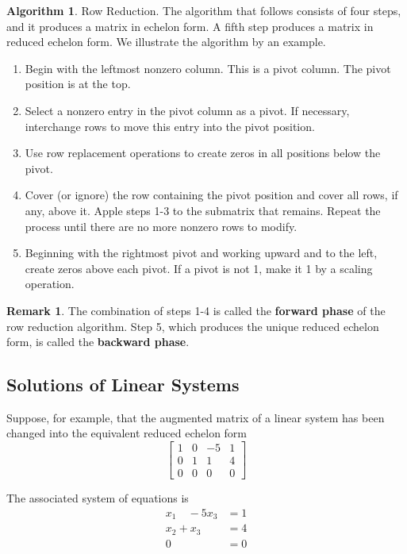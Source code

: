 \documentclass[12pt]{article}
\theoremstyle{definition}
\newtheorem{algorithm}{Algorithm}
\newtheorem*{remark}{Remark}        %
\numberwithin{equation}{theorem}    %
\begin{document}
\begin{algorithm} Row Reduction.
    The algorithm that follows consists of four steps, and it produces a matrix in echelon form. A fifth step produces a matrix in reduced echelon form. We illustrate the algorithm by an example.
    \begin{enumerate}
        \item Begin with the leftmost nonzero column. This is a pivot column. The pivot position is at the top.
        \item Select a nonzero entry in the pivot column as a pivot. If necessary, interchange rows to move this entry into the pivot position.
        \item Use row replacement operations to create zeros in all positions below the pivot.
        \item Cover (or ignore) the row containing the pivot position and cover all rows, if any, above it. Apple steps 1-3 to the submatrix that remains. Repeat the process until there are no more nonzero rows to modify.
        \item Beginning with the rightmost pivot and working upward and to the left, create zeros above each pivot. If a pivot is not 1, make it 1 by a scaling operation.
    \end{enumerate}
    \begin{remark}
        The combination of steps 1-4 is called the \textbf{forward phase} of the row reduction algorithm. Step 5, which produces the unique reduced echelon form, is called the \textbf{backward phase}.
    \end{remark}
\end{algorithm}

\subsection{Solutions of Linear Systems}

Suppose, for example, that the augmented matrix of a linear system has been changed into the equivalent reduced echelon form $$\begin{bmatrix}
        1 & 0 & -5 & 1 \\
        0 & 1 & 1  & 4 \\
        0 & 0 & 0  & 0
    \end{bmatrix}$$

The associated system of equations is
\begin{align} \label{ex:solution-system}
    x_1 \quad -5x_3 & = 1 \\
    x_2 + x_3       & = 4 \\
    0               & = 0
\end{align}
\end{document}
